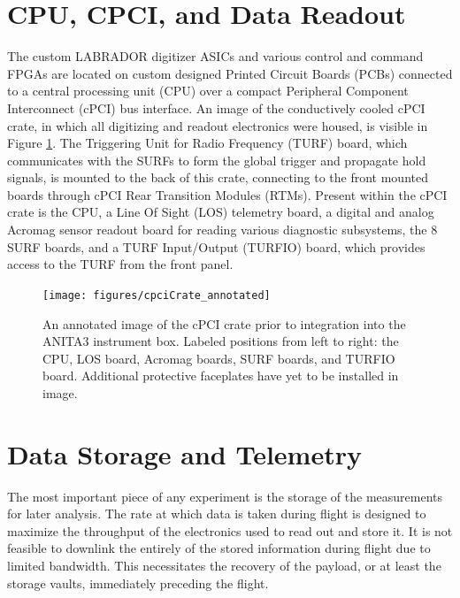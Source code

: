 \section{CPU, CPCI, and Data Readout}
	The custom LABRADOR digitizer ASICs and various control and command FPGAs are located on custom designed Printed Circuit Boards (PCBs) connected to a central processing unit (CPU) over a compact Peripheral Component Interconnect (cPCI) bus interface.  An image of the conductively cooled cPCI crate, in which all digitizing and readout electronics were housed, is visible in Figure \ref{fig:CPCIcrate}.  The Triggering Unit for Radio Frequency (TURF) board, which communicates with the SURFs to form the global trigger and propagate hold signals, is mounted to the back of this crate, connecting to the front mounted boards through cPCI Rear Transition Modules (RTMs).  Present within the cPCI crate is the CPU, a Line Of Sight (LOS) telemetry board, a digital and analog Acromag sensor readout board for reading various diagnostic subsystems, the 8 SURF boards,  and a TURF Input/Output (TURFIO) board, which provides access to the TURF from the front panel.
	
\begin{figure}
	\centering
	\texttt{[image: figures/cpciCrate\_annotated]}
	\caption{An annotated image of the cPCI crate prior to integration into the ANITA3 instrument box.  Labeled positions from left to right: the CPU, LOS board, Acromag boards, SURF boards, and TURFIO board.  Additional protective faceplates have yet to be installed in image.}
	\label{fig:CPCIcrate}
\end{figure}
	
	
\section{Data Storage and Telemetry}
	The most important piece of any experiment is the storage of the measurements for later analysis.  The rate at which data is taken during flight is designed to maximize the throughput of the electronics used to read out and store it.  It is not feasible to downlink the entirely of the stored information during flight due to limited bandwidth.  This necessitates the recovery of the payload, or at least the storage vaults, immediately preceding the flight.

